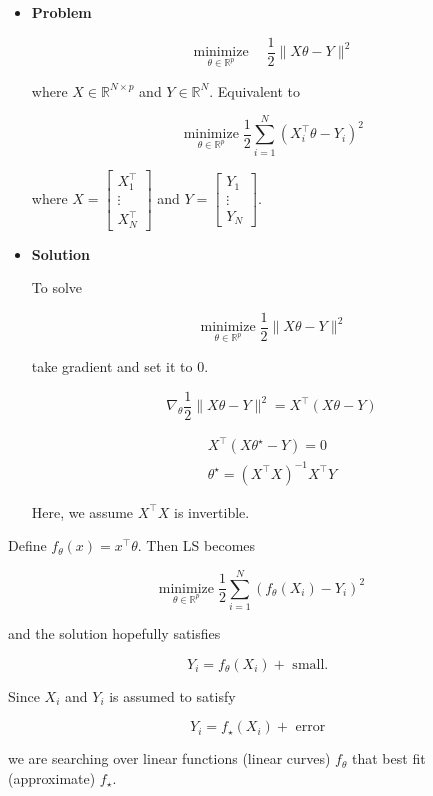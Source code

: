 \begin{example}
    \begin{itemize}
        \item
        \textbf{Problem}

        $$
        \underset{\theta \in \mathbb{R}^{p}}{\operatorname{minimize}} \quad \frac{1}{2}\|X \theta-Y\|^{2}
        $$

        where $X \in \mathbb{R}^{N \times p}$ and $Y \in \mathbb{R}^{N}$. Equivalent to

        $$
        \underset{\theta \in \mathbb{R}^{p}}{\operatorname{minimize}} \frac{1}{2} \sum_{i=1}^{N}\left(X_{i}^{\top} \theta-Y_{i}\right)^{2}
        $$

        where $X=\left[\begin{array}{c}X_{1}^{\top} \\ \vdots \\ X_{N}^{\top}\end{array}\right]$ and $Y=\left[\begin{array}{c}Y_{1} \\ \vdots \\ Y_{N}\end{array}\right]$.
        \item
        \textbf{Solution}

        To solve

        $$
        \underset{\theta \in \mathbb{R}^{p}}{\operatorname{minimize}} \frac{1}{2}\|X \theta-Y\|^{2}
        $$

        take gradient and set it to $0$.

        $$
        \nabla_{\theta} \frac{1}{2}\|X \theta-Y\|^{2}=X^{\top}(X \theta-Y)
        $$

        $$
        \begin{gathered}
        X^{\top}\left(X \theta^{\star}-Y\right)=0 \\
        \theta^{\star}=\left(X^{\top} X\right)^{-1} X^{\top} Y
        \end{gathered}
        $$

        Here, we assume $X^{\top} X$ is invertible.
    \end{itemize}
\end{example}

\begin{concept}
    Define $f_{\theta}(x)=x^{\top} \theta$.
    Then LS becomes

    $$
    \underset{\theta \in \mathbb{R}^{p}}{\operatorname{minimize}} \frac{1}{2} \sum_{i=1}^{N}\left(f_{\theta}\left(X_{i}\right)-Y_{i}\right)^{2}
    $$

    and the solution hopefully satisfies

    $$
    Y_{i}=f_{\theta}\left(X_{i}\right)+\text { small. }
    $$

    Since $X_{i}$ and $Y_{i}$ is assumed to satisfy

    $$
    Y_{i}=f_{\star}\left(X_{i}\right)+\text { error }
    $$

    we are searching over linear functions (linear curves) $f_{\theta}$ that best fit (approximate) $f_{\star}$.
\end{concept}

